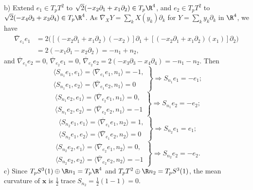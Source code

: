 \begin{itemize}
    b) Extend $e_1\in T_pT^2$ to $\sqrt{2}(-x_2\partial_1+x_1\partial_2)\in T_p\R^4$, 
    and $e_2\in T_pT^2$ to $\sqrt{2}(-x_4\partial_3+x_3\partial_4)\in T_p\R^4$. 
    As $\overline{\nabla}_XY=\sum\limits_k X(y_k)\partial_k$ 
    for $Y=\sum\limits_k y_k\partial_k$ in $\R^4$, we have
    \begin{align*}\overline{\nabla}_{e_1}e_1
    &=2\big([(-x_2\partial_1+x_1\partial_2)(-x_2)]\partial_1
    +[(-x_2\partial_1+x_1\partial_2)(x_1)]\partial_2\big)\\
    &=2(-x_1\partial_1-x_2\partial_2)=-n_1+n_2,
    \end{align*}
    and $\overline{\nabla}_{e_1}e_2=0$, $\overline{\nabla}_{e_2}e_1=0$, 
    $\overline{\nabla}_{e_2}e_2=2(-x_3\partial_3-x_4\partial_4)=-n_1-n_2$. Then
    \[\left.\begin{array}{l}\langle S_{n_1}e_1,e_1\rangle
    =\langle\overline{\nabla}_{e_1}e_1,n_1\rangle=-1,\\
    \langle S_{n_1}e_1,e_2\rangle
    =\langle\overline{\nabla}_{e_1}e_2,n_1\rangle=0\end{array}\right\}
    \Rightarrow S_{n_1}e_1=-e_1;\]
    \[\left.\begin{array}{l}\langle S_{n_1}e_2,e_1\rangle
    =\langle\overline{\nabla}_{e_2}e_1,n_1\rangle=0,\\
    \langle S_{n_1}e_2,e_2\rangle
    =\langle\overline{\nabla}_{e_2}e_2,n_1\rangle=-1\end{array}\right\}
    \Rightarrow S_{n_1}e_2=-e_2;\]
    \[\left.\begin{array}{l}\langle S_{n_2}e_1,e_1\rangle
    =\langle\overline{\nabla}_{e_1}e_1,n_2\rangle=1,\\
    \langle S_{n_2}e_1,e_2\rangle
    =\langle\overline{\nabla}_{e_1}e_2,n_2\rangle=0\end{array}\right\}
    \Rightarrow S_{n_2}e_1=e_1;\]
    \[\left.\begin{array}{l}\langle S_{n_2}e_2,e_1\rangle
    =\langle\overline{\nabla}_{e_2}e_1,n_2\rangle=0,\\
    \langle S_{n_2}e_2,e_2\rangle
    =\langle\overline{\nabla}_{e_2}e_2,n_2\rangle=-1\end{array}\right\}
    \Rightarrow S_{n_2}e_2=-e_2.\]
    c) Since $T_pS^3(1)\oplus\R n_1=T_p\R^4$ and $T_pT^2\oplus\R n_2=T_pS^3(1)$, 
    the mean curvature of $\mathbf{x}$ is $\frac{1}{2}\operatorname{trace}S_{n_2}=\frac{1}{2}(1-1)=0$.


\end{itemize}
